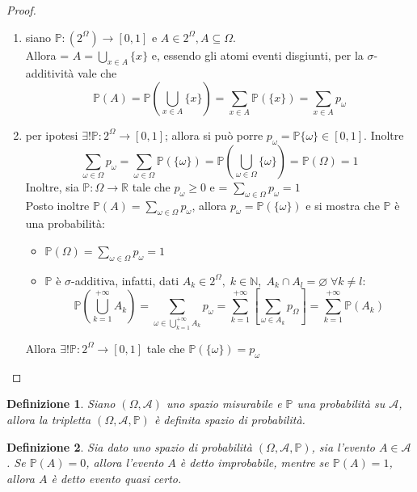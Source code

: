 \documentclass[a4paper,12pt]{article}
\theoremstyle{break}
\newtheorem{definition}{Definizione}[section]
\let\emptyset\varnothing
\numberwithin{equation}{section}
\begin{document}
\begin{proof}
  \begin{enumerate}
    \item siano \(\mathbb{P} : (2^{\Omega}) \to [0,1]\) e \(A \in 2^{\Omega}, A \subseteq \Omega\).  \\
    Allora {\everymath = {\displaystyle} \(A = \bigcup_{x \in A} \{x\}\)} e, essendo gli atomi eventi disgiunti, per la \(\sigma\)-additività vale che 
    \[
      \mathbb{P}(A) = \mathbb{P}\left(\bigcup_{x \in A}\{x\}\right) = \sum_{x \in A} \mathbb{P}(\{x\}) = \sum_{x \in A} p_{\omega}
    \]
    \item per ipotesi \(\exists ! \mathbb{P} : 2^{\Omega} \to [0,1]\); allora si può porre \(p_{\omega} = \mathbb{P}\{\omega\} \in [0,1]\). Inoltre 
    \[
      \sum_{\omega \in \Omega} p_{\omega} = \sum_{\omega \in \Omega} \mathbb{P}(\{\omega\}) = \mathbb{P}\left(\bigcup_{\omega \in \Omega}\{\omega\}\right) = \mathbb{P}(\Omega) = 1
    \]
    Inoltre, sia \(\mathbb{P} : \Omega \to \mathbb{R}\) tale che \(p_{\omega} \geq 0\) e {\everymath = {\displaystyle}\( \sum_{\omega \in \Omega}p_{\omega} = 1\) \\
    Posto inoltre \(\mathbb{P}(A) = \sum_{\omega \in \Omega}p_{\omega}\)}, allora \(p_{\omega} = \mathbb{P}(\{\omega\})\) e si mostra che \(\mathbb{P}\) è una probabilità:
    \begin{itemize}
      \item \(\mathbb{P}(\Omega) = \sum_{\omega \in \Omega}p_{\omega} = 1\)
      \item \(\mathbb{P}\) è \(\sigma\)-additiva, infatti, dati \(A_k \in 2^{\Omega}, \; k \in \mathbb{N}, \; A_k \cap A_l = \emptyset \; \forall k \not = l\):
      \[
        \mathbb{P}\left(\bigcup_{k=1}^{+\infty}A_k\right) = \sum_{\omega \in \bigcup_{k=1}^{+\infty} A_k} p_{\omega} = \sum_{k=1}^{+\infty} \left[\sum_{\omega \in A_k} p_{\Omega}\right] = \sum_{k=1}^{+\infty} \mathbb{P}(A_k)
      \]
    \end{itemize}
  Allora \(\exists ! \mathbb{P} : 2^{\Omega} \to [0,1]\) tale che \(\mathbb{P}(\{\omega\}) = p_{\omega}\)
  \end{enumerate}
\end{proof}
\begin{definition}
  Siano \((\Omega, \mathcal{A})\) uno spazio misurabile e \(\mathbb{P}\) una probabilità su \(\mathcal{A}\), allora la tripletta \((\Omega, \mathcal{A}, \mathbb{P})\) è definita spazio di probabilità.
\end{definition}
\begin{definition}
  Sia dato uno spazio di probabilità \((\Omega, \mathcal{A}, \mathbb{P})\), sia l'evento \(A \in \mathcal{A}\). Se \(\mathbb{P}(A) = 0\), allora l'evento \(A\) è detto improbabile, mentre se \(\mathbb{P}(A) = 1\), allora \(A\) è detto evento quasi certo.
\end{definition}
\end{document}
